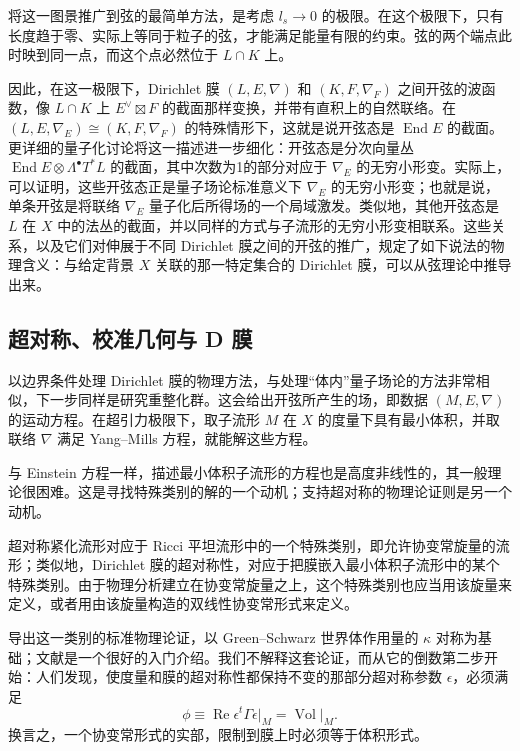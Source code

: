 将这一图景推广到弦的最简单方法，是考虑 $l_s\to0$ 的极限。在这个极限下，只有长度趋于零、实际上等同于粒子的弦，才能满足能量有限的约束。弦的两个端点此时映到同一点，而这个点必然位于 $L\cap K$ 上。

因此，在这一极限下，Dirichlet 膜 $(L,E,\nabla)$ 和 $(K,F,\nabla_F)$ 之间开弦的波函数，像 $L\cap K$ 上 $E^\vee\boxtimes F$ 的截面那样变换，并带有直积上的自然联络。在 $(L,E,\nabla_E)\cong(K,F,\nabla_F)$ 的特殊情形下，这就是说开弦态是 $\operatorname{End}E$ 的截面。更详细的量子化讨论将这一描述进一步细化：开弦态是分次向量丛 $\operatorname{End}E\otimes\Lambda^\bullet T^*L$ 的截面，其中次数为1的部分对应于 $\nabla_E$ 的无穷小形变。实际上，可以证明，这些开弦态正是量子场论标准意义下 $\nabla_E$ 的无穷小形变；也就是说，单条开弦是将联络 $\nabla_E$ 量子化后所得场的一个局域激发。类似地，其他开弦态是 $L$ 在 $X$ 中的法丛的截面，并以同样的方式与子流形的无穷小形变相联系。这些关系，以及它们对伸展于不同 Dirichlet 膜之间的开弦的推广，规定了如下说法的物理含义：与给定背景 $X$ 关联的那一特定集合的 Dirichlet 膜，可以从弦理论中推导出来。

\subsection{超对称、校准几何与 D 膜}\label{sec:1.1.4}

以边界条件处理 Dirichlet 膜的物理方法，与处理“体内”量子场论的方法非常相似，下一步同样是研究重整化群。这会给出开弦所产生的场，即数据 $(M,E,\nabla)$ 的运动方程。在超引力极限下，取子流形 $M$ 在 $X$ 的度量下具有最小体积，并取联络 $\nabla$ 满足 Yang--Mills 方程，就能解这些方程。

与 Einstein 方程一样，描述最小体积子流形的方程也是高度非线性的，其一般理论很困难。这是寻找特殊类别的解的一个动机；支持超对称的物理论证则是另一个动机。

超对称紧化流形对应于 Ricci 平坦流形中的一个特殊类别，即允许协变常旋量的流形；类似地，Dirichlet 膜的超对称性，对应于把膜嵌入最小体积子流形中的某个特殊类别。由于物理分析建立在协变常旋量之上，这个特殊类别也应当用该旋量来定义，或者用由该旋量构造的双线性协变常形式来定义。

导出这一类别的标准物理论证，以 Green--Schwarz 世界体作用量的 $\kappa$ 对称为基础；文献是一个很好的入门介绍。我们不解释这套论证，而从它的倒数第二步开始：人们发现，使度量和膜的超对称性都保持不变的那部分超对称参数 $\epsilon$，必须满足
\begin{equation}\label{eq:1.2}
\phi\equiv\operatorname{Re}\epsilon^t\Gamma\epsilon\big|_M=\operatorname{Vol}\big|_M.
\end{equation}
换言之，一个协变常形式的实部，限制到膜上时必须等于体积形式。

